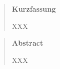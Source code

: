 \vspace*{2cm}

\begin{abstract}
\begin{center}
\normalsize \textbf{Kurzfassung}\\
\end{center}

\noindent
XXX
\end{abstract}

\vspace{2cm}
\begin{abstract}
\begin{center}
\normalsize \textbf{Abstract}\\
\end{center}

\noindent
XXX
\end{abstract}

